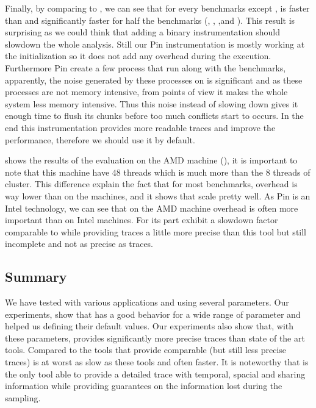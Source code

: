Finally, by comparing \Moca to \MocaPin, we can see that for every benchmarks
except \DC, \MocaPin is faster than \Moca and significantly faster for half
the benchmarks (\MG, \SP, \CG,\FT and \IS). This result is surprising
as we could think that adding a binary instrumentation should slowdown the
whole analysis. Still our Pin instrumentation is mostly working at the
initialization so it does not add any overhead during the execution.
Furthermore Pin create a few process that run along with the benchmarks,
apparently, the noise generated by these processes on \Moca is significant and
as these processes are not memory intensive, from \Moca points of view it
makes the whole system less memory intensive. Thus this noise instead of
slowing \Moca down gives it enough time to flush its chunks before too much
conflicts start to occurs. In the end this instrumentation provides more
readable traces and improve the performance, therefore we should use it by
default.

 shows the results of the evaluation on the AMD machine
(\Idfreeze), it is important to note that this machine have $48$ threads which
is much more than the $8$ threads of \Edel cluster. This difference explain
the fact that for most benchmarks, \Moca overhead is way lower than on the
\Edel machines, and it shows that \Moca scale pretty well.
As  Pin is an Intel technology, we can see that on the
AMD machine \MocaPin overhead is often more important than on Intel machines.
For its part \MemProf exhibit a slowdown factor comparable to \Mitos while
providing traces a little more precise than this tool but still incomplete and
not as precise as \Moca traces.

\subsection{Summary}
\label{sec:expe-cncl}

We have tested \Moca with various applications and using several parameters.
Our experiments, show that \Moca has a good behavior for a wide range of
parameter and helped us defining their default values. Our experiments also
show that, with these parameters, provides significantly more precise traces
than state of the art tools. Compared to the tools that provide comparable
(but still less precise traces) \Moca is at worst as slow as these tools and
often faster.  It is noteworthy that \Moca is the only tool able to provide a
detailed trace with temporal, spacial and sharing information while providing
guarantees on the information lost during the sampling.
